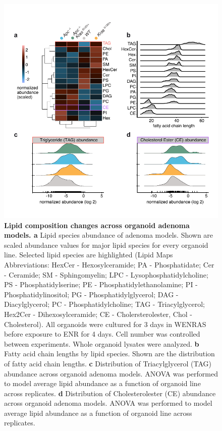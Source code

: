 \begin{flushleft}
\begin{figure}[h]
\centering
\includegraphics[width=350pt,
                height=\textheight,
                keepaspectratio]{figures/adenomaprofiling/pdf/fig_1_6_8.pdf}
\caption[Lipid composition changes across organoid adenoma models]{\textbf{Lipid composition changes across organoid adenoma models. a} Lipid species abundance of adenoma models. Shown are scaled abundance values for major lipid species for every organoid line. Selected lipid species are highlighted (Lipid Maps Abbreviations: HexCer - Hexosylceramide; PA - Phosphatidate; Cer - Ceramide; SM - Sphingomyelin; LPC - Lysophosphatidylcholine; PS - Phosphatidylserine; PE - Phosphatidylethanolamine; PI - Phosphatidylinositol; PG - Phosphatidylglycerol; DAG - Diacylglycerol; PC - Phosphatidylcholine; TAG - Triacylglycerol; Hex2Cer - Dihexosylceramide; CE - Cholersterolester, Chol - Cholesterol). All organoids were cultured for 3 days in WENRAS before exposure to ENR for 4 days. Cell number was controlled between experiments. Whole organoid lysates were analyzed. 
\textbf{b} Fatty acid chain lengths by lipid species. Shown are the distribution of fatty acid chain lengths.
\textbf{c} Distribution of Triacylglycerol (TAG) abundance across organoid adenoma models. ANOVA was performed to model average lipid abundance as a function of organoid line across replicates.
\textbf{d} Distribution of Cholesterolester (CE) abundance across organoid adenoma models. ANOVA was performed to model average lipid abundance as a function of organoid line across replicates.
}
\label{fig_168}
\end{figure}
\bigbreak



\end{flushleft}

